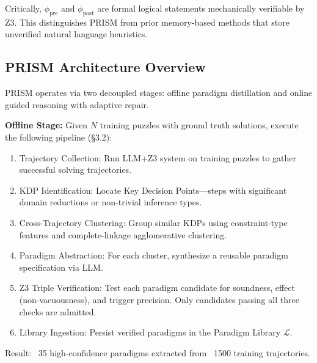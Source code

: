 Critically, $\phi_{\text{pre}}$ and $\phi_{\text{post}}$ are formal logical statements mechanically verifiable by Z3. This distinguishes PRISM from prior memory-based methods that store unverified natural language heuristics.

\subsection{PRISM Architecture Overview}

PRISM operates via two decoupled stages: offline paradigm distillation and online guided reasoning with adaptive repair.

\textbf{Offline Stage:} Given $N$ training puzzles with ground truth solutions, execute the following pipeline (§3.2):
\begin{enumerate}
    \item Trajectory Collection: Run LLM+Z3 system on training puzzles to gather successful solving trajectories.
    \item KDP Identification: Locate Key Decision Points—steps with significant domain reductions or non-trivial inference types.
    \item Cross-Trajectory Clustering: Group similar KDPs using constraint-type features and complete-linkage agglomerative clustering.
    \item Paradigm Abstraction: For each cluster, synthesize a reusable paradigm specification via LLM.
    \item Z3 Triple Verification: Test each paradigm candidate for soundness, effect (non-vacuousness), and trigger precision. Only candidates passing all three checks are admitted.
    \item Library Ingestion: Persist verified paradigms in the Paradigm Library $\mathcal{L}$.
\end{enumerate}
Result: ~35 high-confidence paradigms extracted from ~1500 training trajectories.

